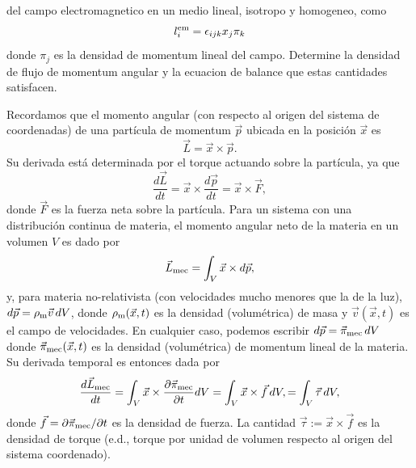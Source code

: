 del
campo electromagnetico en un medio lineal, isotropo y homogeneo, como
\begin{equation}
l_{i}^{\rm em}=\epsilon _{ijk}x_{j}\pi _{k}
\end{equation}%
donde $\pi _{j}$ es la densidad de momentum lineal del campo. Determine la
densidad de flujo de momentum angular y la ecuacion de balance que estas
cantidades satisfacen.


Recordamos que el momento angular (con respecto al origen del sistema de coordenadas) de una partícula de momentum $\vec{p}$ ubicada en la posición $\vec{x}$ es
\begin{equation}
\vec{L}=\vec{x}\times \vec{p}.
\end{equation}
Su derivada está determinada por el torque actuando sobre la partícula, ya que
\begin{equation}
\frac{d\vec{L}}{dt}=\vec{x}\times \frac{d\vec{p}}{dt}=\vec{x}\times \vec{F},
\end{equation}
donde $\vec{F}$ es la fuerza neta sobre la partícula. Para un sistema con una distribución continua de materia, el momento angular neto de la materia en un volumen $V$ es dado por 
\begin{equation}
\vec{L}_{\rm mec}=\int_V\vec{x}\times d\vec{p},
\end{equation}
y, para materia no-relativista (con velocidades mucho menores que la de la luz), $d\vec{p}=\rho_{\rm m}\vec{v}\,dV$, donde $\rho_{\rm m}(\vec{x},t)$ es la densidad (volumétrica) de masa y $\vec{v}(\vec{x},t)$ es el campo de velocidades. En cualquier caso, podemos escribir $d\vec{p}=\vec{\pi}_{\rm mec}\,dV$ donde $\vec{\pi}_{\rm mec}(\vec{x},t)$ es la densidad (volumétrica) de momentum lineal de la materia. Su derivada temporal es entonces dada por
\begin{equation}
\frac{d\vec{L}_{\rm mec}}{dt} = \int_V\vec{x}\times \frac{\partial\vec{\pi}_{\rm mec}}{\partial t}dV = \int_V\vec{x}\times \vec{f}\,dV, = \int_V\vec{\tau}\,dV,
\end{equation}
donde $ \vec{f}=\partial\vec{\pi}_{\rm mec}/{\partial t}$ es la densidad de fuerza. La cantidad $\vec{\tau} := \vec{x}\times \vec{f}$ es la densidad de torque (e.d., torque por unidad de volumen respecto al origen del sistema coordenado).

